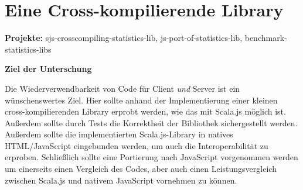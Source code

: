 \documentclass[a4paper, 12pt, hidelinks, listof=totoc, listoftables=totoc, bibliography=totoc]{scrreprt}
\newcommand{\MyMiniSec}[1]{\rmfamily\fontsize{12}{15}\selectfont
	\vspace{7pt}\textbf{#1} %
}
\begin{document}
%

\section{Eine Cross-kompilierende Library}

\textbf{Projekte:} sjs-crosscompiling-statistics-lib, js-port-of-statistics-lib, benchmark-statistics-libs

\MyMiniSec{Ziel der Unterschung}

Die Wiederverwendbarkeit von Code für Client \emph{und} Server ist ein wünschenswertes Ziel. Hier sollte anhand der Implementierung einer kleinen cross-kompilierenden Library erprobt werden, wie das mit Scala.js möglich ist. Außerdem sollte durch Tests die Korrektheit der Bibliothek sichergestellt werden. Außerdem sollte die implementierten Scala.js-Library in natives HTML/JavaScript eingebunden werden, um auch die Interoperabilität zu erproben. Schließlich sollte eine Portierung nach JavaScript vorgenommen werden um einerseits einen Vergleich des Codes, aber auch einen Leistungsvergleich zwischen Scala.js und nativem JavaScript vornehmen zu können.
\end{document}
